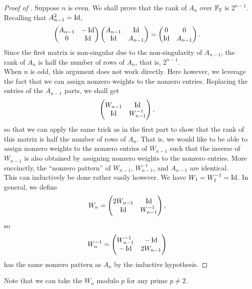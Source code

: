 \begin{proof}[Proof of ]
	Suppose $n$ is even. We shall prove that the rank of $A_n$ over $\mathbb{F}_2$ is $2^{n-1}$. Recalling that $A_{n-1}^2 = \operatorname{Id}$,
	\[ \begin{pmatrix} A_{n-1} & -\operatorname{Id} \\ 0 & \operatorname{Id} \end{pmatrix} \begin{pmatrix} A_{n-1} & \operatorname{Id} \\ \operatorname{Id} & A_{n-1} \end{pmatrix} = \begin{pmatrix} 0 & 0 \\ \operatorname{Id} & A_{n-1} \end{pmatrix}.  \]
	Since the first matrix is non-singular due to the non-singularity of $A_{n-1}$, the rank of $A_n$ is half the number of rows of $A_n$, that is, $2^{n-1}$.\\

	When $n$ is odd, this argument does not work directly. Here however, we leverage the fact that we can assign nonzero weights to the nonzero entries. Replacing the entries of the $A_{n-1}$ parts, we shall get
	\[ \begin{pmatrix} W_{n-1} & \operatorname{Id} \\ \operatorname{Id} & W_{n-1}^{-1} \end{pmatrix}, \]
	so that we can apply the same trick as in the first part to show that the rank of this matrix is half the number of rows of $A_n$.
	That is, we would like to be able to assign nonzero weights to the nonzero entries of $W_{n-1}$ such that the inverse of $W_{n-1}$ is also obtained by assigning nonzero weights to the nonzero entries. More succinctly, the ``nonzero pattern'' of $W_{n-1}$, $W_{n-1}^{-1}$, and $A_{n-1}$ are identical.\\
	This can inductively be done rather easily however. We have $W_1 = W_1^{-1} = \operatorname{Id}$. In general, we define
	\[ W_n = \begin{pmatrix} 2W_{n-1} & \operatorname{Id} \\ \operatorname{Id} & W_{n-1}^{-1} \end{pmatrix}, \]
	so
	\[ W_n^{-1} = \begin{pmatrix} W_{n-1}^{-1} & -\operatorname{Id} \\ -\operatorname{Id} & 2W_{n-1} \end{pmatrix} \]
	has the same nonzero pattern as $A_n$ by the inductive hypothesis.
\end{proof}
Note that we can take the $W_n$ modulo $p$ for any prime $p \ne 2$.\\

